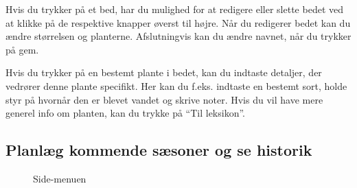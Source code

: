 \begin{minipage}{0.5\textwidth}
Hvis du trykker på et bed, har du mulighed for at redigere eller slette bedet ved at klikke på de respektive knapper øverst til højre. Når du redigerer bedet kan du ændre størrelsen og planterne. Afslutningvis kan du ændre navnet, når du trykker på gem. 

Hvis du trykker på en bestemt plante i bedet, kan du indtaste detaljer, der vedrører denne plante specifikt. Her kan du f.eks. indtaste en bestemt sort, holde styr på hvornår den er blevet vandet og skrive noter. Hvis du vil have mere generel info om planten, kan du trykke på ``Til leksikon''.
\end{minipage}

\subsection{Planlæg kommende sæsoner og se historik}
\begin{minipage}{0.4\textwidth}
\begin{figure}[H]
    \centering
    \caption{Side-menuen}
\end{figure}
\end{minipage} \hfill
